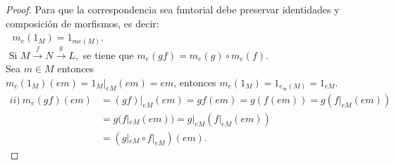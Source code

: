 \documentclass{article}
\begin{document}
\begin{enumerate}[label=\textbf{Ej \arabic*.}]
\begin{proof}
			 Para que la correspondencia sea funtorial debe preservar identidades y composición de morfismos, es decir:\\
			
			\,\, $m_e(1_M)=1_{me(M)}$.\\
			\,\,Si  $ M \stackrel{f}{\longrightarrow} N \stackrel{g}{\longrightarrow} L,$ se tiene que $m_e(gf)=m_e(g)\circ m_e(f)$.\\
			
			Sea $m\in M$ entonces\\
			
			 $m_e(1_M)(em)=1_M|_{eM}(em)=em$, entonces $m_e(1_M)=1_{e_m(M)}=1_{eM}.$
			\begin{align*}
				\boxed{ii)}\ m_e(gf)(em)&=(gf)|_{eM}(em)=gf(em)=g(f(em))=g(f|_{eM}(em))\\
				&=g(f|_{eM}(em))=g|_{eM}(f|_{eM}(em))\\
				&=(g|_{eM}\circ f|_{eM})(em).
			\end{align*}
		\end{proof}
		

\end{enumerate}
\end{document}
